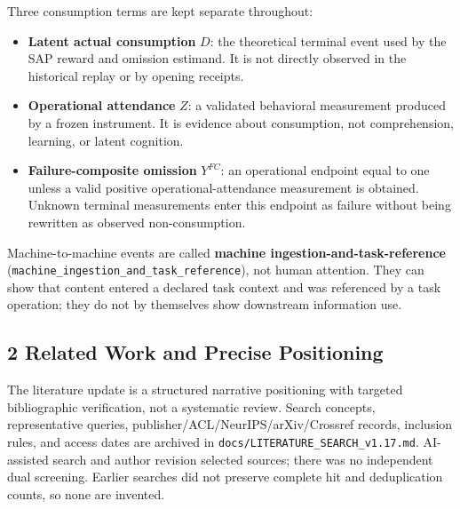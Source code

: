 \documentclass[
  11pt]{article}
\providecommand{\tightlist}{%
  \setlength{\itemsep}{0pt}\setlength{\parskip}{0pt}}
\begin{document}
Three consumption terms are kept separate throughout:

\begin{itemize}
\tightlist
\item
  \textbf{Latent actual consumption} \(D\): the theoretical terminal
  event used by the SAP reward and omission estimand. It is not directly
  observed in the historical replay or by opening receipts.
\item
  \textbf{Operational attendance} \(Z\): a validated behavioral
  measurement produced by a frozen instrument. It is evidence about
  consumption, not comprehension, learning, or latent cognition.
\item
  \textbf{Failure-composite omission} \(Y^{FC}\): an operational
  endpoint equal to one unless a valid positive operational-attendance
  measurement is obtained. Unknown terminal measurements enter this
  endpoint as failure without being rewritten as observed
  non-consumption.
\end{itemize}

Machine-to-machine events are called \textbf{machine
ingestion-and-task-reference}
(\texttt{machine\_ingestion\_and\_task\_reference}), not human
attention. They can show that content entered a declared task context
and was referenced by a task operation; they do not by themselves show
downstream information use.

\subsection{2 Related Work and Precise
Positioning}\label{related-work-and-precise-positioning}

The literature update is a structured narrative positioning with
targeted bibliographic verification, not a systematic review. Search
concepts, representative queries, publisher/ACL/NeurIPS/arXiv/Crossref
records, inclusion rules, and access dates are archived in
\texttt{docs/LITERATURE\_SEARCH\_v1.17.md}. AI-assisted search and
author revision selected sources; there was no independent dual
screening. Earlier searches did not preserve complete hit and
deduplication counts, so none are invented.
\end{document}
